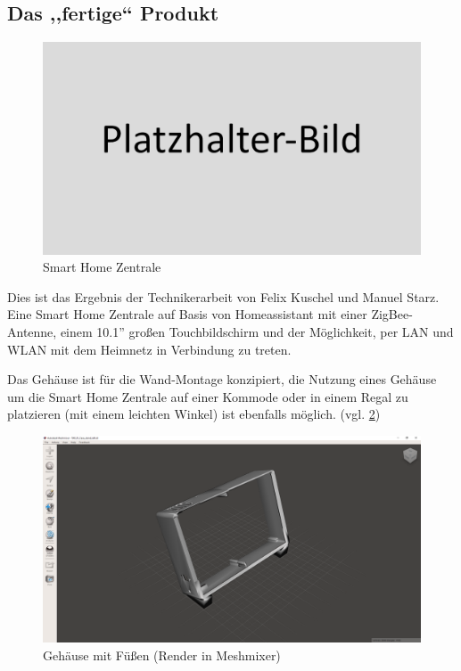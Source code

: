 \subsection{Das ,,fertige`` Produkt}\label{ku_produkt}
\begin{figure}[h!t]
	\includegraphics[width=1\textwidth]{img/placeholder.png}
	\caption[Smart Home Zentrale]{Smart Home Zentrale}
	\label{fig:smart-home-zentrale}
\end{figure}
Dies ist das Ergebnis der Technikerarbeit von Felix Kuschel und Manuel Starz. Eine Smart Home Zentrale auf Basis von Homeassistant mit einer ZigBee-Antenne, einem 10.1'' großen Touchbildschirm und der Möglichkeit, per LAN und WLAN mit dem Heimnetz in Verbindung zu treten.\par
Das Gehäuse ist für die Wand-Montage konzipiert, die Nutzung eines Gehäuse um die Smart Home Zentrale auf einer Kommode oder in einem Regal zu platzieren (mit einem leichten Winkel) ist ebenfalls möglich. (vgl. \ref{fig:case-with-feet})
\begin{figure}[h!tb]
	\includegraphics[width=1\textwidth]{img/stand_case.png}
	\caption[Gehäuse mit Füßen (Render in Meshmixer)]{Gehäuse mit Füßen (Render in Meshmixer)}
	\label{fig:case-with-feet}
\end{figure}